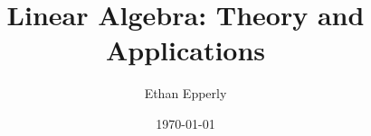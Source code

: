 \documentclass[a4paper,12pt]{book}
\theoremstyle{theorem}
\theoremstyle{definition}
\theoremstyle{remark}
\begin{document}
\author{Ethan Epperly}
\title{Linear Algebra: Theory and Applications}
\date{\today}

\frontmatter
\maketitle
\tableofcontents

\mainmatter




\backmatter
\end{document}
